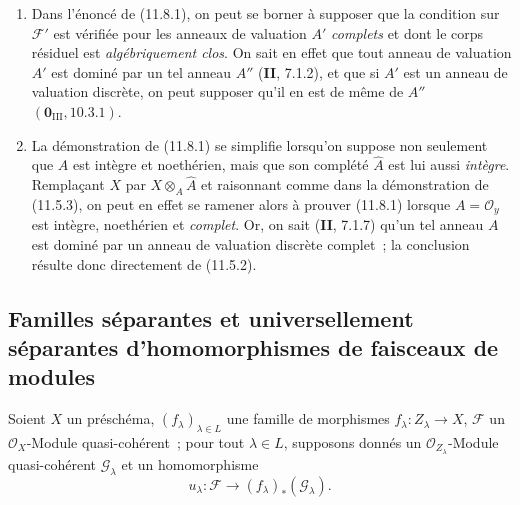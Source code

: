 \begin{remarks}[11.8.2]
\label{IV.11.8.2-fr}
\begin{enumerate}[label=(\roman*)]
  \item Dans l'énoncé de (11.8.1), on peut se borner à supposer que la condition
  sur $\mathcal F'$ est vérifiée pour les anneaux de valuation $A'$ \emph{complets}
  et dont le corps résiduel est \emph{algébriquement clos}. On sait en effet que
  tout anneau de valuation $A'$ est dominé par un tel anneau $A''$
  (\textbf{II}, 7.1.2), et que si $A'$ est un anneau de valuation discrète, on
  peut supposer qu'il en est de même de $A''$
  $(\mathbf 0_{\mathrm{III}},10.3.1)$.
  \item La démonstration de (11.8.1) se simplifie lorsqu'on suppose non seulement
  que $A$ est intègre et noethérien, mais que son complété $\widehat A$ est lui
  aussi \emph{intègre}. Remplaçant $X$ par $X\otimes_A\widehat A$ et raisonnant
  comme dans la démonstration de (11.5.3), on peut en effet se ramener alors à
  prouver (11.8.1) lorsque $A=\mathcal O_y$ est intègre, noethérien et
  \emph{complet}. Or, on sait (\textbf{II}, 7.1.7) qu'un tel anneau $A$ est
  dominé par un anneau de valuation discrète complet~; la conclusion résulte
  donc directement de (11.5.2).
\end{enumerate}
\end{remarks}

\subsection{Familles séparantes et universellement séparantes d'homomorphismes
de faisceaux de modules}
\label{subsection:IV.11.9-fr}

\begin{env}[11.9.1]
\label{IV.11.9.1-fr}
Soient $X$ un préschéma, $(f_{\lambda})_{\lambda\in L}$ une famille de morphismes
$f_{\lambda}:Z_{\lambda}\to X$, $\mathcal F$ un $\mathcal O_X$-Module
quasi-cohérent~; pour tout $\lambda\in L$, supposons donnés un
$\mathcal O_{Z_{\lambda}}$-Module quasi-cohérent $\mathcal G_{\lambda}$ et un
homomorphisme
\begin{equation}
u_{\lambda}:\mathcal F\longrightarrow(f_{\lambda})_*(\mathcal G_{\lambda}).
\label{IV.11.9.1.1-fr}
\tag{11.9.1.1}
\end{equation}
\end{env}

